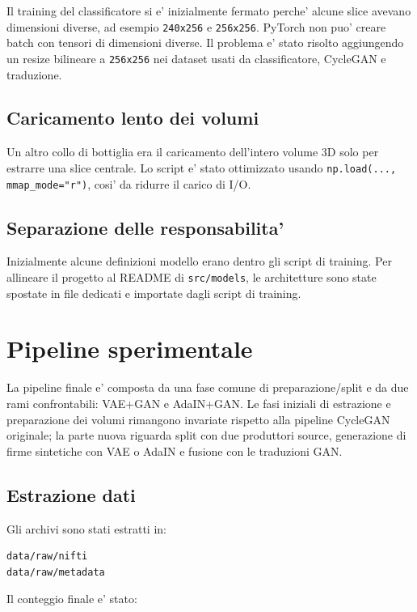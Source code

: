 \documentclass[12pt,a4paper]{article}
\begin{document}
Il training del classificatore si e' inizialmente fermato perche' alcune slice avevano dimensioni diverse, ad esempio \texttt{240x256} e \texttt{256x256}. PyTorch non puo' creare batch con tensori di dimensioni diverse. Il problema e' stato risolto aggiungendo un resize bilineare a \texttt{256x256} nei dataset usati da classificatore, CycleGAN e traduzione.

\subsection{Caricamento lento dei volumi}

Un altro collo di bottiglia era il caricamento dell'intero volume 3D solo per estrarre una slice centrale. Lo script e' stato ottimizzato usando \texttt{np.load(..., mmap\_mode="r")}, cosi' da ridurre il carico di I/O.

\subsection{Separazione delle responsabilita'}

Inizialmente alcune definizioni modello erano dentro gli script di training. Per allineare il progetto al README di \texttt{src/models}, le architetture sono state spostate in file dedicati e importate dagli script di training.

\section{Pipeline sperimentale}

La pipeline finale e' composta da una fase comune di preparazione/split e da due rami confrontabili: VAE+GAN e AdaIN+GAN. Le fasi iniziali di estrazione e preparazione dei volumi rimangono invariate rispetto alla pipeline CycleGAN originale; la parte nuova riguarda split con due produttori source, generazione di firme sintetiche con VAE o AdaIN e fusione con le traduzioni GAN.

\subsection{Estrazione dati}

Gli archivi sono stati estratti in:

\begin{lstlisting}[language=bash]
data/raw/nifti
data/raw/metadata
\end{lstlisting}

Il conteggio finale e' stato:
\end{document}
